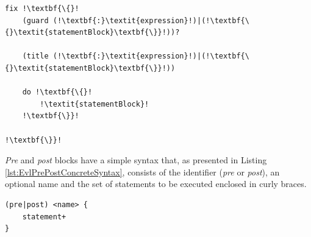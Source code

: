 \begin{lstlisting}[float=t, caption=Concrete Syntax of an EVL fix, label=lst:FixConcreteSyntax, language=EVL, escapechar=!]
fix !\textbf{\{}!
	(guard (!\textbf{:}\textit{expression}!)|(!\textbf{\{}\textit{statementBlock}\textbf{\}}!))?
	
	(title (!\textbf{:}\textit{expression}!)|(!\textbf{\{}\textit{statementBlock}\textbf{\}}!))
	
	do !\textbf{\{}!
		!\textit{statementBlock}!
	!\textbf{\}}!
	
!\textbf{\}}!
\end{lstlisting}

\emph{Pre} and \emph{post} blocks have a simple syntax that, as presented in Listing \ref{lst:EvlPrePostConcreteSyntax}, consists of the identifier (\emph{pre} or \emph{post}), an optional name and the set of statements to be executed enclosed in curly braces.

\begin{lstlisting}[float=t, caption=Concrete Syntax of Pre and Post blocks, label=lst:EvlPrePostConcreteSyntax, language=EVL]
(pre|post) <name> {
	statement+
}
\end{lstlisting}





